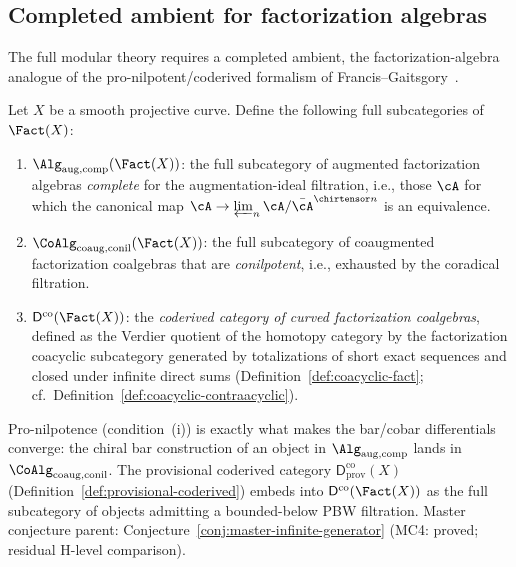 \subsection{Completed ambient for factorization algebras}
\label{subsec:completed-ambient}

The full modular theory requires a completed ambient, the
factorization-algebra analogue of the pro-nilpotent/coderived
formalism of Francis--Gaitsgory~\cite{FG12}.

\begin{definition}
\label{def:completed-chiral-ambient}
Let $X$ be a smooth projective curve. Define the following full
subcategories of $\Fact(X)$:
\begin{enumerate}[label=\textup{(\roman*)}]
\item $\Alg_{\mathrm{aug,comp}}(\Fact(X))$: the full subcategory of
 augmented factorization algebras \emph{complete} for the
 augmentation-ideal filtration, i.e., those $\cA$ for which the
 canonical map
 $\cA \to \varprojlim_n \cA / \bar{\cA}^{\chirtensor n}$
 is an equivalence.
\item $\CoAlg_{\mathrm{coaug,conil}}(\Fact(X))$: the full subcategory
 of coaugmented factorization coalgebras that are \emph{conilpotent},
 i.e., exhausted by the coradical filtration.
\item $\mathsf{D}^{\mathrm{co}}(\Fact(X))$: the \emph{coderived
 category of curved factorization coalgebras}, defined as the
 Verdier quotient of the homotopy category by the factorization
 coacyclic subcategory generated by totalizations of short exact
 sequences and closed under infinite direct sums
 \textup{(}Definition~\textup{\ref{def:coacyclic-fact}}; cf.\
 Definition~\ref{def:coacyclic-contraacyclic}\textup{)}.
\end{enumerate}
Pro-nilpotence (condition~(i)) is exactly what makes the bar/cobar
differentials converge: the chiral bar construction of an object in
$\Alg_{\mathrm{aug,comp}}$ lands in $\CoAlg_{\mathrm{coaug,conil}}$.
The provisional coderived category
$\mathsf{D}^{\mathrm{co}}_{\mathrm{prov}}(X)$
(Definition~\ref{def:provisional-coderived}) embeds into
$\mathsf{D}^{\mathrm{co}}(\Fact(X))$
as the full subcategory of objects admitting a bounded-below PBW
filtration.
\textup{Master conjecture parent:}
Conjecture~\textup{\ref{conj:master-infinite-generator}} \textup{(MC4: proved; residual H-level comparison).}
\end{definition}

